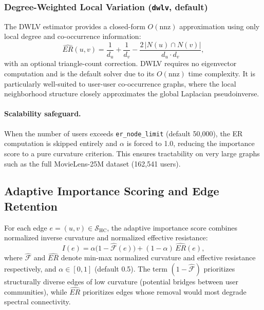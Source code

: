 \subsubsection*{Degree-Weighted Local Variation (\texttt{dwlv}, default)}

The DWLV estimator provides a closed-form $O(\text{nnz})$ approximation using only local degree and co-occurrence information:
\begin{equation}
    \widehat{ER}(u,v) = \frac{1}{d_u} + \frac{1}{d_v} - \frac{2\,|N(u)\cap N(v)|}{d_u \cdot d_v},
    \label{eq:er_dwlv}
\end{equation}
with an optional triangle-count correction. DWLV requires no eigenvector computation and is the default solver due to its $O(\text{nnz})$ time complexity. It is particularly well-suited to user-user co-occurrence graphs, where the local neighborhood structure closely approximates the global Laplacian pseudoinverse.

\paragraph{Scalability safeguard.} When the number of users exceeds \texttt{er\_node\_limit} (default 50,000), the ER computation is skipped entirely and $\alpha$ is forced to 1.0, reducing the importance score to a pure curvature criterion. This ensures tractability on very large graphs such as the full MovieLens-25M dataset (162,541 users).

\subsection{Adaptive Importance Scoring and Edge Retention}

For each edge $e = (u,v) \in \mathcal{S}_\text{HC}$, the adaptive importance score combines normalized inverse curvature and normalized effective resistance:
\begin{equation}
    I(e) = \alpha \bigl(1 - \widehat{\mathcal{F}}(e)\bigr) + (1 - \alpha)\,\widehat{ER}(e),
    \label{eq:importance}
\end{equation}
where $\widehat{\mathcal{F}}$ and $\widehat{ER}$ denote min-max normalized curvature and effective resistance respectively, and $\alpha \in [0,1]$ (default 0.5). The term $(1 - \widehat{\mathcal{F}})$ prioritizes structurally diverse edges of low curvature (potential bridges between user communities), while $\widehat{ER}$ prioritizes edges whose removal would most degrade spectral connectivity.

